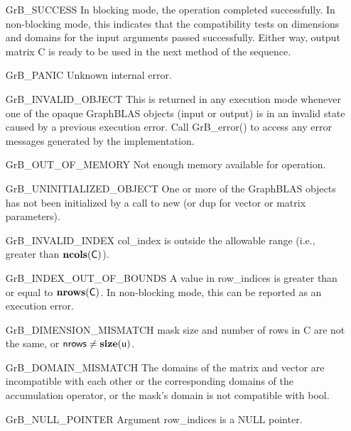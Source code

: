 \begin{itemize}[leftmargin=2.1in]
    \item[{\sf GrB\_SUCCESS}]         In blocking mode, the operation completed
    successfully. In non-blocking mode, this indicates that the compatibility 
    tests on dimensions and domains for the input arguments passed successfully. 
    Either way, output matrix {\sf C} is ready to be used in the next method of 
    the sequence.

    \item[{\sf GrB\_PANIC}]           Unknown internal error.

    \item[{\sf GrB\_INVALID\_OBJECT}] This is returned in any execution mode 
    whenever one of the opaque GraphBLAS objects (input or output) is in an invalid 
    state caused by a previous execution error.  Call {\sf GrB\_error()} to access 
    any error messages generated by the implementation.

    \item[{\sf GrB\_OUT\_OF\_MEMORY}] Not enough memory available for operation.

    \item[{\sf GrB\_UNINITIALIZED\_OBJECT}] One or more of the GraphBLAS objects
    has not been initialized by a call to {\sf new} (or {\sf dup} for vector or
    matrix parameters).

    \item[{\sf GrB\_INVALID\_INDEX}]    {\sf col\_index} is outside the allowable 
    range (i.e., greater than $\bold{ncols}({\sf C})$).

    \item[{\sf GrB\_INDEX\_OUT\_OF\_BOUNDS}]  A value in {\sf row\_indices}
    is greater than or equal to $\bold{nrows}({\sf C})$.  In 
    non-blocking mode, this can be reported as an execution error.

    \item[{\sf GrB\_DIMENSION\_MISMATCH}] {\sf mask} size and number of rows
    in {\sf C} are not the same, or ${\sf nrows} \neq \bold{size}({\sf u})$.

    \item[{\sf GrB\_DOMAIN\_MISMATCH}]    The domains of the matrix and vector are
    incompatible with each other or the corresponding domains of the
    accumulation operator, or the mask's domain is not compatible with {\sf bool}.

    \item[{\sf GrB\_NULL\_POINTER}] Argument {\sf row\_indices} is a {\sf NULL} pointer.
\end{itemize}

